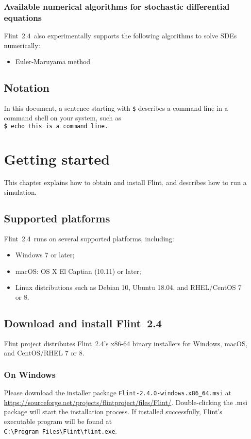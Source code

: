 \documentclass[a4paper,10pt]{report}
\def\FlintVersion{2.4}
\def\FlintLongVersion{2.4.0}
\def\Flint{Flint~\FlintVersion}
\def\FlintFilenamePrefix{Flint-\FlintLongVersion}
\newcommand{\filename}[1]{{\tt #1}}
\begin{document}
\subsection{Available numerical algorithms for stochastic differential equations}
\Flint\ also experimentally supports the following algorithms to solve SDEs
numerically:
\begin{itemize}
\item Euler-Maruyama method \cite{Allen2007}
\end{itemize}

\section{Notation}
In this document, a sentence starting with {\tt \$} describes a command line in
a command shell on your system, such as\\
{\tt \$ echo this is a command line.}



\chapter{Getting started}

This chapter explains how to obtain and install Flint, and describes how to run
a simulation.

\section{Supported platforms}
\Flint\ runs on several supported platforms, including:
\begin{itemize}
\item Windows 7 or later;
\item macOS: OS X El Captian (10.11) or later;
\item Linux distributions such as Debian 10, Ubuntu 18.04, and RHEL/CentOS 7 or 8.
\end{itemize}

\section{Download and install \Flint}
Flint project distributes \Flint's x86-64 binary installers for Windows,
macOS, and CentOS/RHEL 7 or 8.

\subsection{On Windows}
Please download the installer package
\filename{\FlintFilenamePrefix-windows.x86\_64.msi} at
\url{https://sourceforge.net/projects/flintproject/files/Flint/}.
Double-clicking the .msi package will start the installation process.
If installed successfully, Flint's executable program will be found at\\
\filename{C:\textbackslash Program Files\textbackslash Flint\textbackslash flint.exe}.
\end{document}
